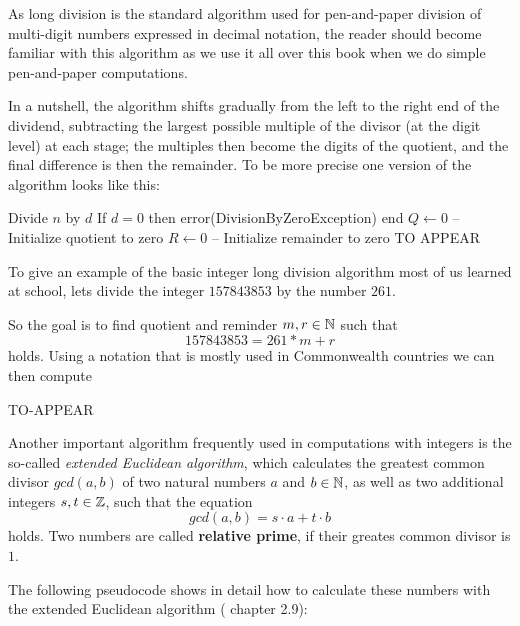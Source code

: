 As long division is the standard algorithm used for pen-and-paper division of multi-digit numbers expressed in decimal notation, the reader should become familiar with this algorithm as we use it all over this book when we do simple pen-and-paper computations.

In a nutshell, the algorithm shifts gradually from the left to the right end of the dividend, subtracting the largest possible multiple of the divisor (at the digit level) at each stage; the multiples then become the digits of the quotient, and the final difference is then the remainder. To be more precise one version of the algorithm looks like this:

\begin{algorithmic}
\State Divide $n$ by $d$
\State If $d = 0$ then error(DivisionByZeroException) end
\State $Q \leftarrow 0 $ -- Initialize quotient to zero
\State $R \leftarrow 0 $ -- Initialize remainder to zero               
\State TO APPEAR
\end{algorithmic}

\begin{example} To give an example of the basic integer long division algorithm most of us learned at school, lets divide the integer $157843853$ by the number $261$. 

So the goal is to find quotient and reminder $m,r \in \mathbb{N}$ such that
$$157843853 = 261 * m +r$$
holds. Using a notation that is mostly used in Commonwealth countries we can then compute

TO-APPEAR 
\end{example}

Another important algorithm frequently used in computations with integers is the so-called \textit{extended Euclidean algorithm}, which calculates the greatest common divisor $ gcd (a, b) $ of two natural numbers $ a $ and $ b \in \mathbb{N} $, as well as two additional integers $ s, t \in \mathbb{Z} $, such that the equation
\begin{equation}
\label{eq: erw_Eukl_algo}
gcd (a, b) = s \cdot a + t \cdot b
\end{equation}
holds. Two numbers are called \textbf{relative prime}, if their greates common divisor is $1$.

The following pseudocode shows in detail how to calculate these numbers with the extended Euclidean algorithm (\cite{JB} chapter 2.9):




